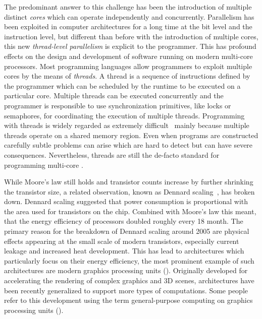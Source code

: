 The predominant answer to this challenge has been the introduction of multiple distinct \emph{cores} which can operate independently and concurrently.
Parallelism has been exploited in computer architectures for a long time at the bit level and the instruction level, but different than before with the introduction of multiple cores, this new \emph{thread-level parallelism} is explicit to the programmer.
This has profound effects on the design and development of software running on modern multi-core processors.
Most programming languages allow programmers to exploit multiple cores by the means of \emph{threads}.
A thread is a sequence of instructions defined by the programmer which can be scheduled by the runtime to be executed on a particular core.
Multiple threads can be executed concurrently and the programmer is responsible to use synchronization primitives, like locks or semaphores, for coordinating the execution of multiple threads.
Programming with threads is widely regarded as extremely difficult~\cite{Lee06} mainly because multiple threads operate on a shared memory region.
Even when programs are constructed carefully subtle problems can arise which are hard to detect but can have severe consequences.
Nevertheless, threads are still the de-facto standard for programming multi-core \CPUs.

\bigskip

\noindent
While Moore's law still holds and transistor counts increase by further shrinking the transistor size, a related observation, known as Dennard scaling~\cite{DennardRiBaLe1974}, has broken down.
Dennard scaling suggested that power consumption is proportional with the area used for transistors on the chip.
Combined with Moore's law this meant, that the energy efficiency of processors doubled roughly every 18 month.
The primary reason for the breakdown of Dennard scaling around 2005 are physical effects appearing at the small scale of modern transistors, especially current leakage and increased heat development.
This has lead to architectures which particularly focus on their energy efficiency, the most prominent example of such architectures are modern graphics processing units (\GPUs).
Originally developed for accelerating the rendering of complex graphics and 3D scenes, \GPU architectures have been recently generalized to support more types of computations.
Some people refer to this development using the term general-purpose computing on graphics processing units (\GPGPU).


